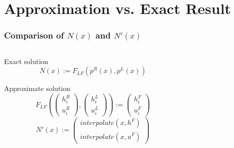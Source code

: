 \documentclass{beamer}
\begin{document}
\section{Approximation vs. Exact Result}
\label{sec:comparing-approx-and-exact-result}

\begin{frame}
  \frametitle{Comparison of $N(x)$ and $N'(x)$}
  \begin{columns}
    \begin{column}{.5\textwidth}
      \begin{block}{Exact solution}
        \vspace{-.3cm} %
        \begin{equation*}
          N(x) := F_{LF}(p^R(x),p^L(x))
        \end{equation*}
      \end{block}
      \begin{block}{Approximate solution}
        \vspace{-.5cm} %
        \begin{equation*}
          F_{LF}\left(
            \begin{pmatrix}
              h_i^R \\ u_i^R
            \end{pmatrix},
            \begin{pmatrix}
              h_i^L \\ u_i^L
            \end{pmatrix}
          \right) :=
          \begin{pmatrix}
            h_i^F \\ u_i^F
          \end{pmatrix} %
        \end{equation*}
        \vspace{-.1cm} %
        \begin{equation*}
          N'(x) :=
          \begin{pmatrix}
            interpolate(x,h^F) \\ interpolate(x,u^F)
          \end{pmatrix}
        \end{equation*}
      \end{block}
    \end{column}
    \begin{column}{.4\textwidth}
      \begin{center}
        \begin{tikzpicture}[scale=0.7]

\end{tikzpicture}
\end{center}
\end{column}
\end{columns}
\end{frame}
\end{document}
